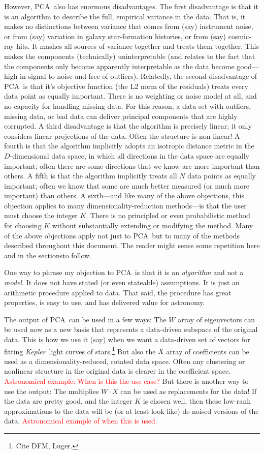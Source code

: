 \documentclass[12pt, letterpaper]{article}
\newcommand{\sectionnames}{sections}
\newcommand{\acronym}[1]{{\small{#1}}}
\newcommand{\PCA}{\acronym{PCA}}
\newcommand{\project}[1]{\textsl{#1}}
\newcommand{\Kepler}{\project{Kepler}}
\newcommand{\todo}[1]{\textcolor{red}{#1}}  %
\begin{document}
However, \PCA\ also has enormous disadvantages.
The first disadvantage is that it is an algorithm to describe the full,
empirical variance in the data.
That is, it makes no distinctions between variance that comes from (say)
instrument noise, or from (say) variation in galaxy star-formation histories,
or from (say) cosmic-ray hits.
It mashes all sources of variance together and treats them together.
This makes the components (technically) uninterpretable (and relates to the
fact that the components only become apparently interpretable as the data become good---high
in signal-to-noise and free of outliers).
Relatedly, the second disadvantage of \PCA\ is that it's objective function
(the L2 norm of the residuals) treats every data point
as equally important.
There is no weighting or noise model at all, and no capacity for handling
missing data.
For this reason, a data set with outliers, missing data, or bad data can deliver
principal components that are highly corrupted.
A third disadvantage is that the algorithm is precisely linear; it only
considers linear projections of the data.
Often the structure is non-linear!
A fourth is that the algorithm implicitly adopts an isotropic distance metric
in the $D$-dimensional data space, 
in which all directions in the data space are equally important; often there
are some directions that we know are more important than others.
A fifth is that the algorithm implicitly treats all $N$ data points as equally
important; often we know that some are much better measured (or much more important)
than others.
A sixth---and like many of the above objections, this objection applies to
many dimensionality-reduction methods---is that the user must choose the integer
$K$.
There is no principled or even probabilistic method for choosing $K$ without
substantially extending or modifying the method.
Many of the above objections apply not just to \PCA\ but to many of the methods
described throughout this document.
The reader might sense some repetition here and in the \sectionnames to follow.

One way to phrase my objection to \PCA\ is that it is an \emph{algorithm}
and not a \emph{model}.
It does not have stated (or even stateable) assumptions.
It is just an arithmetic procedure applied to data.
That said, the procedure has great properties, is easy to use, and has
delivered value for astronomy.

The output of \PCA\ can be used in a few ways:
The $W$ array of eigenvectors can be used now as a new basis that represents a
data-driven subspace of the original data.
This is how we use it (say) when we want a data-driven set of vectors for fitting
\Kepler\ light curves of stars.\footnote{Cite DFM, Luger.}
But also the $X$ array of coefficients can be used as a dimensionality-reduced,
rotated data space.
Often any clustering or nonlinear structure in the original data is clearer in
the coefficient space.
\todo{Astronomical example: When is this the use case?}
But there is another way to use the output:
The multiplies $W\cdot X$ can be used as replacements for the data!
If the data are pretty good, and the integer $K$ is chosen well, then these
low-rank approximations to the data will be (or at least look like) de-noised
versions of the data.
\todo{Astronomical example of when this is used.}
\end{document}
